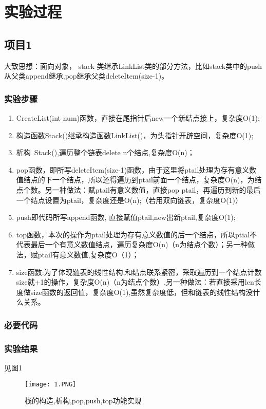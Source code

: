\section{实验过程}
\subsection{项目1}
大致思想：面向对象， stack 类继承LinkList类的部分方法，比如stack类中的push从父类append继承,pop继承父类deleteItem(size-1)。
\subsubsection{实验步骤}
\begin{enumerate}
\item CreateList(int num)函数，直接在尾指针后new一个新结点接上，复杂度O(1);
\item 构造函数Stack()继承构造函数LinkList()，为头指针开辟空间，复杂度O(1);
\item 析构~Stack(),遍历整个链表delete n个结点,复杂度O(n)；
\item pop函数，即所写deleteItem(size-1)函数，由于这里将ptail处理为存有意义数值结点的下一个结点，所以还得遍历到ptail前面一个结点，复杂度O(n)，为结点个数。另一种做法：赋ptail有意义数值，直接pop ptail，再遍历到新的最后一个结点设置为ptail，复杂度还是O(n);（若用双向链表，复杂度O(1)）
\item push即代码所写append函数, 直接赋值ptail,new出新ptail,复杂度O(1);
\item top函数，本次的操作为ptail处理为存有意义数值的后一个结点，所以ptial不代表最后一个有意义数值结点，遍历复杂度O(n)（n为结点个数）；另一种做法，赋ptail有意义数值,复杂度O（1）；
\item size函数:为了体现链表的线性结构,和结点联系紧密，采取遍历到一个结点计数size就+1的操作，复杂度O(n)（n为结点个数）,另一种做法：若直接采用len长度做size函数的返回值，复杂度O(1),虽然复杂度低，但和链表的线性结构没什么关系。
\end{enumerate}
\subsubsection{必要代码}

\subsubsection{实验结果}见图1
	\begin{figure}[!bthp]
	\centering
        \texttt{[image: 1.PNG]}
        \caption{栈的构造,析构,pop,push,top功能实现}
      \end{figure}

